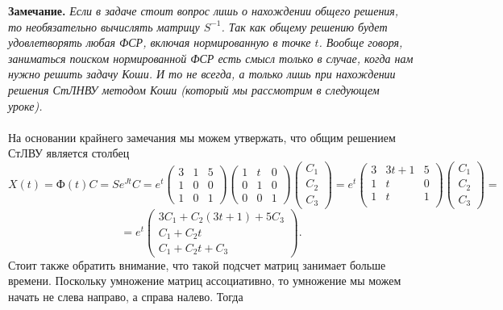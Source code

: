 \documentclass[a4paper, 12pt]{article}
\newcommand{\FI}{\text{Ф}}
\begin{document}
\textbf{Замечание.} \textit{Если в задаче стоит вопрос лишь о нахождении общего решения, то необязательно вычислять матрицу $S^{-1}$. Так как общему решению будет удовлетворять любая ФСР, включая нормированную в точке $t$. Вообще говоря, заниматься поиском нормированной ФСР есть смысл только в случае, когда нам нужно решить задачу Коши. И то не всегда, а только лишь при нахождении решения СтЛНВУ методом Коши (который мы рассмотрим в следующем уроке).}\\\\
На основании крайнего замечания мы можем утвержать, что общим решением СтЛВУ является столбец $$X(t) = \FI(t)C = Se^{Jt}C = e^t\begin{pmatrix}
	3 & 1 & 5\\
	1 & 0 & 0\\
	1 & 0 & 1
\end{pmatrix}\begin{pmatrix}
	1 & t & 0\\
	0 & 1 & 0\\
	0 & 0 & 1
\end{pmatrix} \begin{pmatrix}
C_1\\C_2\\C_3
\end{pmatrix}= e^t\begin{pmatrix}
3 & 3t+ 1 & 5\\
1 & t & 0\\
1 & t & 1\\
\end{pmatrix}\begin{pmatrix}
C_1\\C_2\\C_3
\end{pmatrix} =$$ $$= e^t\begin{pmatrix}
3C_1 + C_2(3t+1) + 5C_3\\
C_1 + C_2t\\
C_1 + C_2t + C_3
\end{pmatrix}.$$
Стоит также обратить внимание, что такой подсчет матриц занимает больше времени. Поскольку умножение матриц ассоциативно, то умножение мы можем начать не слева направо, а справа налево. Тогда 
\end{document}

